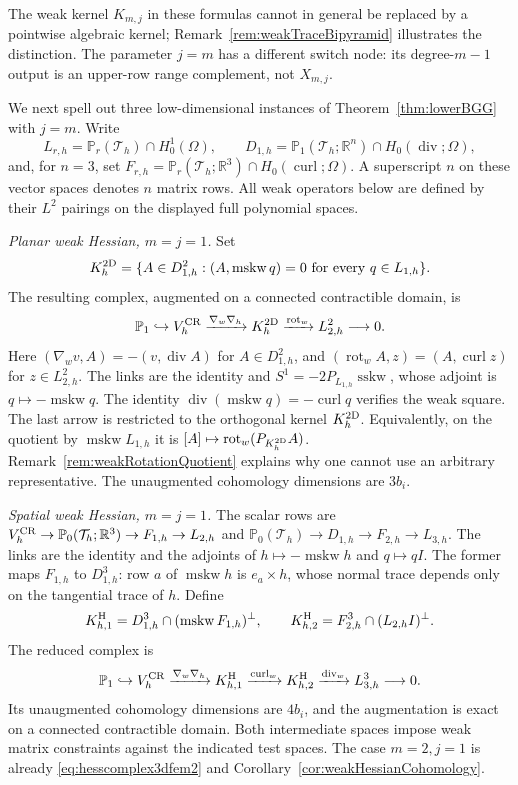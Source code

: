 \documentclass[10pt]{amsart}
\numberwithin{equation}{section}
\newcommand{\curl}{\operatorname{curl}}
\renewcommand{\div}{\operatorname{div}}
\newcommand{\rot}{\operatorname{rot}}
\newcommand{\mskw}{\operatorname{mskw}}
\newcommand{\sskw}{\operatorname{sskw}}
\begin{document}
The weak kernel $K_{m,j}$ in these formulas cannot in general be replaced
by a pointwise algebraic kernel; Remark~\ref{rem:weakTraceBipyramid}
illustrates the distinction. The parameter $j=m$ has a different
switch node: its degree-$m-1$ output is an upper-row range complement,
not $X_{m,j}$.

We next spell out three low-dimensional instances of
Theorem~\ref{thm:lowerBGG} with $j=m$. Write
\[
L_{r,h}=\mathbb P_r(\mathcal T_h)\cap H_0^1(\Omega),\qquad
D_{1,h}=\mathbb P_1(\mathcal T_h;\mathbb R^n)\cap H_0(\div;\Omega),
\]
and, for $n=3$, set
$F_{r,h}=\mathbb P_r(\mathcal T_h;\mathbb R^3)\cap H_0(\curl;\Omega)$.
A superscript $n$ on these vector spaces denotes $n$ matrix rows.
All weak operators below are defined by their $L^2$ pairings on the
displayed full polynomial spaces.

\smallskip\noindent\emph{Planar weak Hessian, $m=j=1$.}
Set
\[
K_h^{\rm 2D}=\{A\in D_{1,h}^2:
(A,\mskw q)=0\ \text{for every }q\in L_{1,h}\}.
\]
The resulting complex, augmented on a connected contractible domain, is
\begin{equation}\label{eq:linearHessian2d}
\mathbb P_1\hookrightarrow V_h^{\rm CR}
\xrightarrow{\nabla_w\nabla_h}K_h^{\rm 2D}
\xrightarrow{\rot_w}L_{2,h}^2\longrightarrow0.
\end{equation}
Here $(\nabla_wv,A)=-(v,\div A)$ for $A\in D_{1,h}^2$, and
$(\rot_wA,z)=(A,\curl z)$ for $z\in L_{2,h}^2$.
The links are the identity and $S^1=-2P_{L_{1,h}}\sskw$, whose adjoint
is $q\mapsto-\mskw q$. The identity
$\div(\mskw q)=-\curl q$ verifies the weak square.
The last arrow is restricted to the orthogonal kernel $K_h^{\rm 2D}$.
Equivalently, on the quotient by $\mskw L_{1,h}$ it is
$[A]\mapsto\rot_w(P_{K_h^{\rm 2D}}A)$.
Remark~\ref{rem:weakRotationQuotient} explains why one cannot use an
arbitrary representative. The unaugmented cohomology dimensions are $3b_i$.

\smallskip\noindent\emph{Spatial weak Hessian, $m=j=1$.}
The scalar rows are
$V_h^{\rm CR}\to\mathbb P_0(\mathcal T_h;\mathbb R^3)\to F_{1,h}\to L_{2,h}$
and $\mathbb P_0(\mathcal T_h)\to D_{1,h}\to F_{2,h}\to L_{3,h}$.
The links are the identity and the adjoints of
$h\mapsto-\mskw h$ and $q\mapsto qI$.
The former maps $F_{1,h}$ to $D_{1,h}^3$: row $a$ of $\mskw h$ is
$e_a\times h$, whose normal trace depends only on the tangential trace of $h$.
Define
\[
K_{h,1}^{\rm H}=D_{1,h}^3\cap(\mskw F_{1,h})^\perp,\qquad
K_{h,2}^{\rm H}=F_{2,h}^3\cap(L_{2,h}I)^\perp.
\]
The reduced complex is
\begin{equation}\label{eq:linearHessian3d}
\mathbb P_1\hookrightarrow V_h^{\rm CR}
\xrightarrow{\nabla_w\nabla_h}K_{h,1}^{\rm H}
\xrightarrow{\curl_w}K_{h,2}^{\rm H}
\xrightarrow{\div_w}L_{3,h}^3\longrightarrow0.
\end{equation}
Its unaugmented cohomology dimensions are $4b_i$, and the augmentation
is exact on a connected contractible domain. Both intermediate spaces
impose weak matrix constraints against the indicated test spaces.
The case $m=2,j=1$ is already \eqref{eq:hesscomplex3dfem2} and
Corollary~\ref{cor:weakHessianCohomology}.
\end{document}
